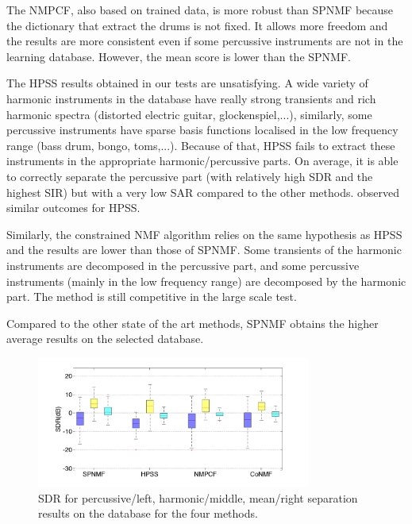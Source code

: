 \documentclass[journal]{IEEEtran}
\begin{document}
The NMPCF, also based on trained data, is more robust than SPNMF because the dictionary that extract the drums is not fixed. It allows more freedom and the results are more consistent even if some percussive instruments are not in the learning database. However, the mean score is lower than the SPNMF.

The HPSS results obtained in our tests are unsatisfying. A wide variety of harmonic instruments in the database have really strong transients and rich harmonic spectra (distorted electric guitar, glockenspiel,...), similarly, some percussive instruments have sparse basis functions localised in the low frequency range (bass drum, bongo, toms,...). Because of that, HPSS fails to extract these instruments in the appropriate harmonic/percussive parts. On average, it is able to correctly separate the percussive part (with relatively high SDR and the highest SIR) but with a very low SAR compared to the other methods. \cite{canadas2014percussive} observed similar outcomes for HPSS.

Similarly, the constrained NMF algorithm relies on the same hypothesis as HPSS and the results are lower than those of SPNMF. Some transients of the harmonic instruments are decomposed in the percussive part, and some percussive instruments (mainly in the low frequency range) are decomposed by the harmonic part. The method is still competitive in the large scale test. 

Compared to the other state of the art methods, SPNMF obtains the higher average results on the selected database. 


\begin{figure}[h]

  \centering 
  \includegraphics[width=9cm]{fig/DatabaseSDR.png}
  \caption{\label{DatabaseSDR} SDR for percussive/left, harmonic/middle, mean/right separation results on the database for the four methods.}
  
\end{figure}
\end{document}
